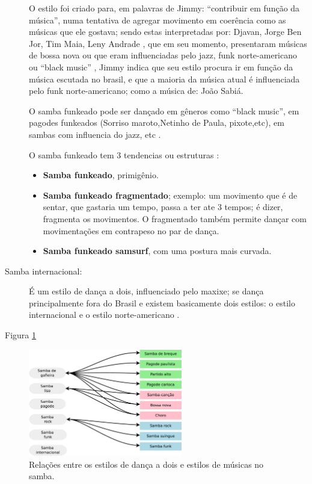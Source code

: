 \begin{description}
O estilo foi criado para, em palavras de Jimmy: ``contribuir em função da música'', 
numa tentativa de agregar movimento em coerência como as músicas que ele gostava;
sendo estas interpretadas por:
Djavan, Jorge Ben Jor, Tim Maia, Leny Andrade \cite{sambafunkeadoJimmyDeOliveiraPart1}, que em seu momento, 
presentaram músicas de bossa nova ou que eram influenciadas pelo jazz, funk norte-americano ou ``black music'' \cite{sambafunkeadoJimmyDeOliveiraPart1} \cite{sambafunkeadoJimmyDeOliveiraPart3},
Jimmy indica que seu estilo procura ir em função da música escutada no brasil, 
e que a maioria da música atual é influenciada pelo funk norte-americano;
como a música de: João Sabiá. 

O samba funkeado pode ser dançado em gêneros como ``black music'',
em pagodes funkeados (Sorriso maroto,Netinho de Paula, pixote,etc), em sambas com influencia do jazz, etc \cite{sambafunkeadoJimmyDeOliveiraPart3}.

O samba funkeado tem 3 tendencias ou estruturas  \cite{sambafunkeadoJimmyDeOliveiraPart2}:
\begin{itemize}
\item \textbf{Samba funkeado}, primigênio.
\item \textbf{Samba funkeado fragmentado}; exemplo: um movimento que é de sentar, que gastaria um tempo, 
passa a ter ate 3 tempos; é dizer, fragmenta os movimentos. 
O fragmentado também permite dançar com movimentações em contrapeso no par de dança.
\item \textbf{Samba funkeado samsurf}, com uma postura mais curvada.
\end{itemize}

 

\item[Samba internacional:] É um estilo de dança a dois, influenciado pelo maxixe;
se dança principalmente fora do Brasil e existem basicamente dois estilos: 
o estilo internacional e o estilo norte-americano \cite[pp. 134-135]{perna2002samba}.

\end{description}

Figura \ref{fig:sambadavavsmusica} \cite[pp. 134-138]{perna2002samba}

\begin{figure}[h]
  \centering
    \includegraphics[width=0.6\textwidth]{chapters/cap-historia-musicasamba/dancavcmusica.eps}
  \caption{Relações entre os estilos de dança a dois e estilos de músicas no samba.}
\label{fig:sambadavavsmusica}
\end{figure}


